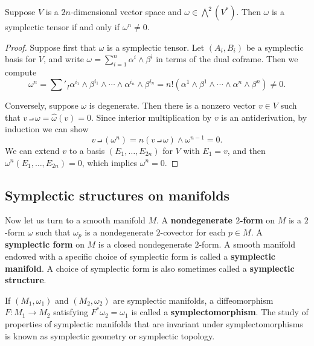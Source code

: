 \begin{proposition}\label{symplectic tensor iff n-fold product nonzero}
Suppose $V$ is a $2n$-dimensional vector space and $\omega\in\bigwedge^2(V^*)$. Then $\omega$ is a symplectic tensor if and only if $\omega^n\neq 0$.
\end{proposition}
\begin{proof}
Suppose first that $\omega$ is a symplectic tensor. Let $(A_i,B_i)$ be a symplectic basis for $V$, and write $\omega=\sum_{i=1}^{n}\alpha^i\wedge\beta^i$ in terms of the dual coframe. Then we compute
\[\omega^n=\sum'_{I}\alpha^{i_1}\wedge\beta^{i_1}\wedge\cdots\wedge\alpha^{i_n}\wedge\beta^{i_n}=n!(\alpha^1\wedge\beta^1\wedge\cdots\wedge\alpha^n\wedge\beta^n)\neq 0.\]

Conversely, suppose $\omega$ is degenerate. Then there is a nonzero vector $v\in V$ such that $v\intprod\omega=\widehat{\omega}(v)=0$. Since interior multiplication by $v$ is an antiderivation, by induction we can show
\[v\intprod(\omega^n)=n(v\intprod\omega)\wedge\omega^{n-1}=0.\]
We can extend $v$ to a basis $(E_1,\dots,E_{2n})$ for $V$ with $E_1=v$, and then $\omega^n(E_1,\dots,E_{2n})=0$, which implies $\omega^n=0$.
\end{proof}

\subsection{Symplectic structures on manifolds}
Now let us turn to a smooth manifold $M$. A \textbf{nondegenerate $2$-form} on $M$ is a $2$-form $\omega$ such that $\omega_p$ is a nondegenerate $2$-covector for each $p\in M$. A \textbf{symplectic form} on $M$ is a closed nondegenerate $2$-form. A smooth manifold endowed with a specific choice of symplectic form is called a \textbf{symplectic manifold}. A choice of symplectic form is also sometimes called a \textbf{symplectic structure}.

If $(M_1,\omega_1)$ and $(M_2,\omega_2)$ are symplectic manifolds, a diffeomorphism $F:M_1\to M_2$ satisfying $F^*\omega_2=\omega_1$ is called a \textbf{symplectomorphism}. The study of properties of symplectic manifolds that are invariant under symplectomorphisms is known as symplectic geometry or symplectic topology.

